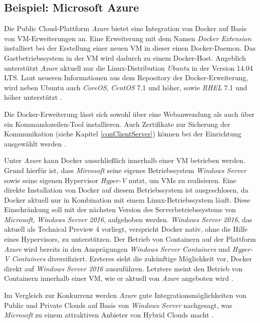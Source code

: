 \documentclass[../main.tex]{subfiles}
\begin{document}
    \subsection{Beispiel: Microsoft Azure}
    \label{azure}
      Die Public Cloud-Plattform \emph{Azure} bietet eine Integration von Docker auf Basis von VM-Erweiterungen an. Eine Erweiterung mit dem Namen \emph{Docker Extension} installiert bei der Erstellung einer neuen VM in dieser einen Docker-Daemon. Das Gastbetriebssystem in der VM wird dadurch zu einem Docker-Host. Angeblich unterstützt \emph{Azure} aktuell nur die Linux-Distribution \emph{Ubuntu} in der Version 14.04 \acrshort{LTS}. Laut neueren Informationen aus dem Repository der Docker-Erweiterung, wird neben Ubuntu auch \emph{CoreOS}, \emph{CentOS} 7.1 und höher, sowie \emph{\acrshort{RHEL}} 7.1 und höher unterstützt \cite{githubAzureVMExtension}.


      Die Docker-Erweiterung lässt sich sowohl über eine Webanwendung als auch über ein Kommandozeilen-Tool installieren. Auch Zertifikate zur Sicherung der Kommunikation (siehe Kapitel \ref{conClientServer}) können bei der Einrichtung ausgewählt werden \cite{azureDockerExtension}\cite{azureDockerExtensionCLI}.

      Unter \emph{Azure} kann Docker ausschließlich innerhalb einer VM betrieben werden. Grund hierfür ist, dass \emph{Mircosoft} seine eigenes Betriebssystem \emph{Windows Server} sowie seine eigenen Hypervisor \emph{Hyper-V} nutzt, um VMs zu realisieren. Eine direkte Installation von Docker auf diesem Betriebssystem ist ausgeschlosen, da Docker aktuell nur in Kombination mit einem Linux-Betriebssystem läuft. Diese Einschränkung soll mit der nächsten Version des Serverbetriebssystems von \emph{Microsoft}, \emph{Windows Server 2016}, aufgehoben werden. \emph{Windows Server 2016}, das aktuell als Technical Preview 4 vorliegt, verspricht Docker nativ, ohne die Hilfe eines Hypervisors, zu unterstützen. Der Betrieb von Containern auf der Plattform \emph{Azure} wird bereits in den Ausprägungen \emph{Windows Server Containers} und \emph{Hyper-V Containers} diversifiziert. Ersteres sieht die zukünftige Möglichkeit vor, Docker direkt auf \emph{Windows Server 2016} auszuführen. Letztere meint den Betrieb von Containern innerhalb einer VM, wie er aktuell von \emph{Azure} angeboten wird \cite{dockerPartnershipMicrosoft}\cite{azureWindowsContainers}.

      Im Vergleich zur Konkurrenz werden \emph{Azure} gute Integrationsmöglichkeiten von Public und Private Clouds auf Basis von \emph{Windows Server} nachgesagt, was \emph{Microsoft} zu einem attraktiven Anbieter von Hybrid Clouds macht \cite{IBMDockerOpenStack}.
\end{document}
